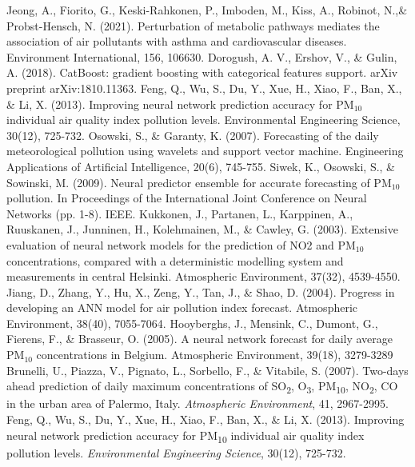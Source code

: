 \documentclass{book}
\numberwithin{equation}{section}
\numberwithin{figure}{section}
\begin{document}
\begin{thebibliography}{99}
    Jeong, A., Fiorito, G., Keski-Rahkonen, P., Imboden, M., Kiss, A., Robinot, N.,\& Probst-Hensch, N. (2021). Perturbation of metabolic pathways mediates the association of air pollutants with asthma and cardiovascular diseases. Environment International, 156, 106630.
    Dorogush, A. V., Ershov, V., \& Gulin, A. (2018). CatBoost: gradient boosting with categorical features support. arXiv preprint arXiv:1810.11363.
    Feng, Q., Wu, S., Du, Y., Xue, H., Xiao, F., Ban, X., \& Li, X. (2013). Improving neural network prediction accuracy for PM$_{10}$ individual air quality index pollution levels. Environmental Engineering Science, 30(12), 725-732.
    Osowski, S., \& Garanty, K. (2007). Forecasting of the daily meteorological pollution using wavelets and support vector machine. Engineering Applications of Artificial Intelligence, 20(6), 745-755.
    Siwek, K., Osowski, S., \& Sowinski, M. (2009). Neural predictor ensemble for accurate forecasting of PM$_{10}$ pollution. In Proceedings of the International Joint Conference on Neural Networks (pp. 1-8). IEEE.
    Kukkonen, J., Partanen, L., Karppinen, A., Ruuskanen, J., Junninen, H., Kolehmainen, M., \& Cawley, G. (2003). Extensive evaluation of neural network models for the prediction of NO2 and PM$_{10}$ concentrations, compared with a deterministic modelling system and measurements in central Helsinki. Atmospheric Environment, 37(32), 4539-4550.
    Jiang, D., Zhang, Y., Hu, X., Zeng, Y., Tan, J., \& Shao, D. (2004). Progress in developing an ANN model for air pollution index forecast. Atmospheric Environment, 38(40), 7055-7064.
    Hooyberghs, J., Mensink, C., Dumont, G., Fierens, F., \& Brasseur, O. (2005). A neural network forecast for daily average PM$_{10}$ concentrations in Belgium. Atmospheric Environment, 39(18), 3279-3289
    Brunelli, U., Piazza, V., Pignato, L., Sorbello, F., \& Vitabile, S. (2007). Two-days ahead prediction of daily maximum concentrations of SO\textsubscript{2}, O\textsubscript{3}, PM\textsubscript{10}, NO\textsubscript{2}, CO in the urban area of Palermo, Italy. \textit{Atmospheric Environment}, 41, 2967-2995.
    Feng, Q., Wu, S., Du, Y., Xue, H., Xiao, F., Ban, X., \& Li, X. (2013). Improving neural network prediction accuracy for PM\textsubscript{10} individual air quality index pollution levels. \textit{Environmental Engineering Science}, 30(12), 725-732.

\end{thebibliography}
\end{document}
